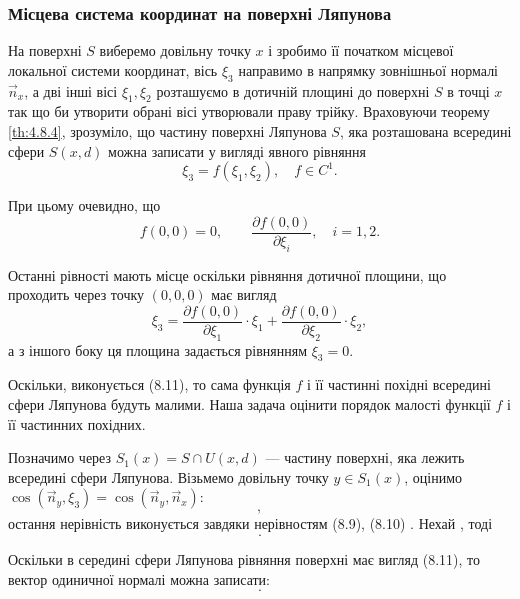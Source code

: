 \subsubsection{Місцева система координат на поверхні Ляпунова}

На поверхні $S$ виберемо довільну точку $x$ і зробимо її початком місцевої локальної системи координат, вісь $\xi_3$ направимо в напрямку зовнішньої нормалі $\vec n_x$, а дві інші вісі $\xi_1, \xi_2$ розташуємо в дотичній площині до поверхні $S$ в точці $x$ так що би утворити обрані вісі утворювали праву трійку. Враховуючи теорему \ref{th:4.8.4}, зрозуміло, що частину поверхні Ляпунова $S$, яка розташована всередині сфери $S(x, d)$ можна записати у вигляді явного рівняння
\begin{equation}
	\xi_3 = f(\xi_1, \xi_2), \quad f \in C^1.
\end{equation}

При цьому очевидно, що
\begin{equation}
	f(0, 0) = 0, \qquad \frac{\partial f(0, 0)}{\partial \xi_i}, \quad i = 1, 2.
\end{equation}

Останні рівності мають місце оскільки рівняння дотичної площини, що проходить через точку $(0,0,0)$ має вигляд
\begin{equation}
	\xi_3 = \frac{\partial f(0, 0)}{\partial \xi_1} \cdot \xi_1 + \frac{\partial f(0, 0)}{\partial \xi_2} \cdot \xi_2,
\end{equation}
а з іншого боку ця площина задається рівнянням $\xi_3 = 0$.

Оскільки, виконується (8.11), то сама функція $f$ і її частинні похідні всередині сфери Ляпунова будуть малими. Наша задача оцінити порядок малості функції $f$ і її частинних похідних. \medskip

Позначимо через $S_1(x) = S \cap U(x, d)$ --- частину поверхні, яка лежить всередині сфери Ляпунова. Візьмемо довільну точку $y \in S_1(x)$, оцінимо $\cos(\vec n_y, \xi_3) = \cos(\vec n_y, \vec n_x)$:
\begin{equation}
	,
\end{equation}
остання нерівність виконується завдяки нерівностям (8.9), (8.10)	 . Нехай  , тоді
\begin{equation}
	.
\end{equation}

Оскільки в середині сфери Ляпунова рівняння поверхні має вигляд (8.11), то вектор одиничної нормалі можна записати:
\begin{equation}
	.
\end{equation}

